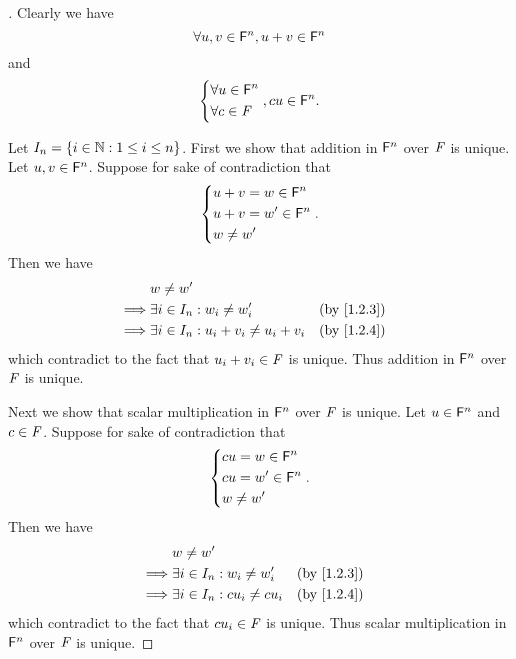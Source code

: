 \begin{proof}[]
	Clearly we have
	\[
		\forall u, v \in \mathsf{F}^n, u + v \in \mathsf{F}^n
	\]
	and
	\[
		\begin{dcases}
			\forall u \in \mathsf{F}^n \\
			\forall c \in \mathit{F}
		\end{dcases}, cu \in \mathsf{F}^n.
	\]

	Let \(I_n = \left\lbrace i \in \mathbb{N} : 1 \leq i \leq n\right\rbrace\).
	First we show that addition in \(\mathsf{F}^n\) over \(\mathit{F}\) is unique.
	Let \(u, v \in \mathsf{F}^n\).
	Suppose for sake of contradiction that
	\[
		\begin{dcases}
			u + v = w \in \mathsf{F}^n  \\
			u + v = w' \in \mathsf{F}^n \\
			w \neq w'
		\end{dcases}.
	\]
	Then we have
	\begin{align*}
		         & w \neq w'                                                                  \\
		\implies & \exists i \in I_n : w_i \neq w_i'            &  & \text{(by \cref{1.2.3})} \\
		\implies & \exists i \in I_n : u_i + v_i \neq u_i + v_i &  & \text{(by \cref{1.2.4})}
	\end{align*}
	which contradict to the fact that \(u_i + v_i \in \mathit{F}\) is unique.
	Thus addition in \(\mathsf{F}^n\) over \(\mathit{F}\) is unique.

	Next we show that scalar multiplication in \(\mathsf{F}^n\) over \(\mathit{F}\) is unique.
	Let \(u \in \mathsf{F}^n\) and \(c \in \mathit{F}\).
	Suppose for sake of contradiction that
	\[
		\begin{dcases}
			cu = w \in \mathsf{F}^n  \\
			cu = w' \in \mathsf{F}^n \\
			w \neq w'
		\end{dcases}.
	\]
	Then we have
	\begin{align*}
		         & w \neq w'                                                          \\
		\implies & \exists i \in I_n : w_i \neq w_i'    &  & \text{(by \cref{1.2.3})} \\
		\implies & \exists i \in I_n : c u_i \neq c u_i &  & \text{(by \cref{1.2.4})}
	\end{align*}
	which contradict to the fact that \(c u_i \in \mathit{F}\) is unique.
	Thus scalar multiplication in \(\mathsf{F}^n\) over \(\mathit{F}\) is unique.


\end{proof}
